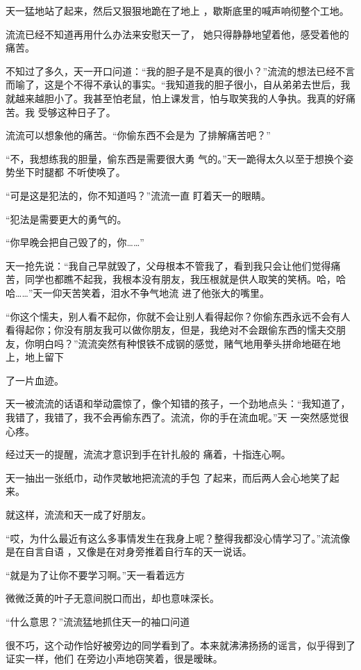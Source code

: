 \documentclass{article}
\begin{document}
天一猛地站了起来，然后又狠狠地跪在了地上
，歇斯底里的喊声响彻整个工地。 

流流已经不知道再用什么办法来安慰天一了，
她只得静静地望着他，感受着他的痛苦。 

不知过了多久，天一开口问道：“我的胆子是不是真的很小？”流流的想法已经不言而喻了，这是个不得不承认的事实。“我知道我的胆子很小，自从弟弟去世后，我就越来越胆小了。我甚至怕老鼠，怕上课发言，怕与取笑我的人争执。我真的好痛苦。我
受够这种日子了。 

流流可以想象他的痛苦。“你偷东西不会是为
了排解痛苦吧？” 

“不，我想练我的胆量，偷东西是需要很大勇
\newpage
气的。”天一跪得太久以至于想换个姿势坐下时腿都
不听使唤了。 

“可是这是犯法的，你不知道吗？”流流一直
盯着天一的眼睛。 


“犯法是需要更大的勇气的。 


“你早晚会把自己毁了的，你……” 

天一抢先说：“我自己早就毁了，父母根本不管我了，看到我只会让他们觉得痛苦，同学也都瞧不起我，我根本没有朋友，我压根就是供人取笑的笑柄。哈，哈哈……”天一仰天苦笑着，泪水不争气地流
进了他张大的嘴里。 

“你这个懦夫，别人看不起你，你就不会让别人看得起你？你偷东西永远不会有人看得起你；你没有朋友我可以做你朋友，但是，我绝对不会跟偷东西的懦夫交朋友，你明白吗？”流流突然有种恨铁不成钢的感觉，赌气地用拳头拼命地砸在地上，地上留下
\newpage

了一片血迹。 

天一被流流的话语和举动震惊了，像个知错的孩子，一个劲地点头：“我知道了，我错了，我错了，我不会再偷东西了。流流，你的手在流血呢。”天
一突然感觉很心疼。 

经过天一的提醒，流流才意识到手在针扎般的
痛着，十指连心啊。 

天一抽出一张纸巾，动作灵敏地把流流的手包
了起来，而后两人会心地笑了起来。 


就这样，流流和天一成了好朋友。 

“哎，为什么最近有这么多事情发生在我身上呢？整得我都没心情学习了。”流流像是在自言自语
，又像是在对身旁推着自行车的天一说话。 

“就是为了让你不要学习啊。”天一看着远方

\newpage
微微泛黄的叶子无意间脱口而出，却也意味深长。 

“什么意思？”流流猛地抓住天一的袖口问道

很不巧，这个动作恰好被旁边的同学看到了。本来就沸沸扬扬的谣言，似乎得到了证实一样，他们
在旁边小声地窃笑着，很是暧昧。 
\end{document}
